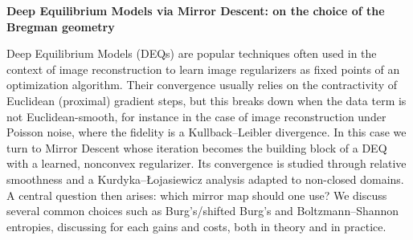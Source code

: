 \documentclass[11pt]{article}
\begin{document}
\begin{center}
  {\Large\bfseries Deep Equilibrium Models via Mirror Descent: on the choice of the Bregman geometry}
\end{center}

\bigskip

\noindent
Deep Equilibrium Models (DEQs) are popular techniques often used in the context of image reconstruction to learn image regularizers as fixed points of an optimization algorithm. Their convergence usually relies on the contractivity of Euclidean (proximal) gradient steps, but this breaks down when the data term is not Euclidean-smooth, for instance in the case of image reconstruction under Poisson noise, where the fidelity is a Kullback--Leibler divergence. In this case we turn to Mirror Descent whose iteration becomes the building block of a DEQ with a learned, nonconvex regularizer. Its convergence is studied through relative smoothness and a Kurdyka--{\L}ojasiewicz analysis adapted to non-closed domains. A central question then arises: which mirror map should one use? We discuss several common choices such as Burg's/shifted Burg's and Boltzmann--Shannon entropies, discussing for each gains and costs, both in theory and in practice.
\end{document}
